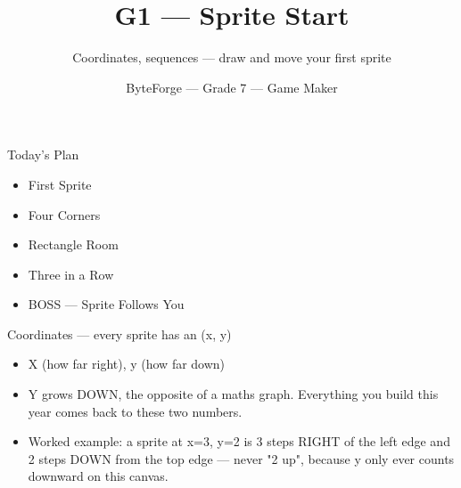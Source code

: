 \documentclass[aspectratio=169]{beamer}
\title{G1 — Sprite Start}
\subtitle{Coordinates, sequences — draw and move your first sprite}
\author{ByteForge --- Grade 7 --- Game Maker}
\date{}
\begin{document}
\begin{frame}
    \titlepage
\end{frame}

\begin{frame}{Today's Plan}
    \begin{itemize}
        \item First Sprite
        \item Four Corners
        \item Rectangle Room
        \item Three in a Row
        \item[$\bigstar$] BOSS --- Sprite Follows You
    \end{itemize}
\end{frame}

\begin{frame}{Coordinates — every sprite has an (x, y)}
    \large
    \begin{itemize}
        \item X (how far right), y (how far down)
        \item Y grows DOWN, the opposite of a maths graph. Everything you build this year comes back to these two numbers.
        \item Worked example: a sprite at x=3, y=2 is 3 steps RIGHT of the left edge and 2 steps DOWN from the top edge — never "2 up", because y only ever counts downward on this canvas.
    \end{itemize}

    \begin{center}
    \end{center}
\end{frame}
\end{document}
